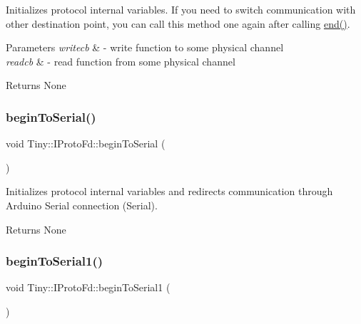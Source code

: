 Initializes protocol internal variables. If you need to switch communication with other destination point, you can call this method one again after calling \hyperlink{classTiny_1_1IProtoFd_ad17e76d0ef7ea40838e51acc2498c482}{end()}. 
\begin{DoxyParams}{Parameters}
{\em writecb} & -\/ write function to some physical channel \\
\hline
{\em readcb} & -\/ read function from some physical channel \\
\hline
\end{DoxyParams}
\begin{DoxyReturn}{Returns}
None 
\end{DoxyReturn}
\mbox{\label{classTiny_1_1IProtoFd_a1cf42b4182e49dcde4862a768d07c811}} 
\subsubsection{\texorpdfstring{begin\+To\+Serial()}{beginToSerial()}}
{\footnotesize\ttfamily void Tiny\+::\+I\+Proto\+Fd\+::begin\+To\+Serial (\begin{DoxyParamCaption}{ }\end{DoxyParamCaption})\hspace{0.3cm}{\ttfamily [inline]}}

Initializes protocol internal variables and redirects communication through Arduino Serial connection (Serial). \begin{DoxyReturn}{Returns}
None 
\end{DoxyReturn}
\mbox{\label{classTiny_1_1IProtoFd_a7d41a0caae1d5e6808a441c821ed8927}} 
\subsubsection{\texorpdfstring{begin\+To\+Serial1()}{beginToSerial1()}}
{\footnotesize\ttfamily void Tiny\+::\+I\+Proto\+Fd\+::begin\+To\+Serial1 (\begin{DoxyParamCaption}{ }\end{DoxyParamCaption})\hspace{0.3cm}{\ttfamily [inline]}}

